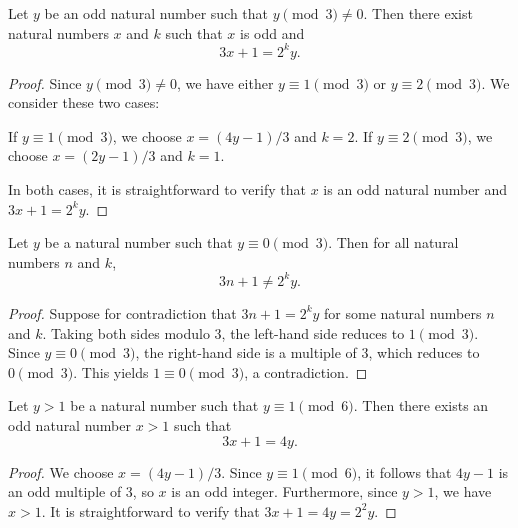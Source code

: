 \begin{lemma}\label{lemma:exists_predecessor_of_odd}\leanok
Let $y$ be an odd natural number such that $y \pmod 3 \neq 0$. Then there exist natural numbers $x$
and $k$ such that $x$ is odd and
\begin{equation}
    3x + 1 = 2^k y.
\end{equation}
\end{lemma}
\begin{proof}\leanok
Since $y \pmod 3 \neq 0$, we have either $y \equiv 1 \pmod 3$ or $y \equiv 2 \pmod 3$. We consider
these two cases:

If $y \equiv 1 \pmod 3$, we choose $x = (4y - 1)/3$ and $k = 2$.
If $y \equiv 2 \pmod 3$, we choose $x = (2y - 1)/3$ and $k = 1$.

In both cases, it is straightforward to verify that $x$ is an odd natural number and $3x+1=2^k y$.
\end{proof}

\begin{lemma}\label{lemma:no_odd_predecessor_for_div3}\leanok
Let $y$ be a natural number such that $y \equiv 0 \pmod 3$. Then for all natural numbers $n$ and $k$,
\begin{equation}
    3n + 1 \neq 2^k y.
\end{equation}
\end{lemma}
\begin{proof}\leanok
Suppose for contradiction that $3n + 1 = 2^k y$ for some natural numbers $n$ and $k$.
Taking both sides modulo $3$, the left-hand side reduces to $1 \pmod 3$.
Since $y \equiv 0 \pmod 3$, the right-hand side is a multiple of $3$, which reduces to $0 \pmod 3$.
This yields $1 \equiv 0 \pmod 3$, a contradiction.
\end{proof}

\begin{lemma}\label{lemma:exists_predecessor_gt_one_mod1}\leanok
Let $y > 1$ be a natural number such that $y \equiv 1 \pmod 6$. Then there exists an odd natural
number $x > 1$ such that
\begin{equation}
    3x + 1 = 4 y.
\end{equation}
\end{lemma}
\begin{proof}\leanok
We choose $x = (4y - 1)/3$. Since $y \equiv 1 \pmod 6$, it follows that $4y - 1$ is an odd multiple
of $3$, so $x$ is an odd integer.
Furthermore, since $y > 1$, we have $x > 1$.
It is straightforward to verify that $3x + 1 = 4y = 2^2 y$.
\end{proof}

